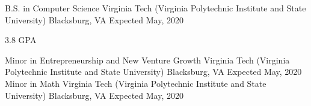 

\begin{cventries}

  \cventry
    {B.S. in Computer Science} %
    {Virginia Tech (Virginia Polytechnic Institute and State University)} %
    {Blacksburg, VA} %
    {Expected May, 2020} %
    {
      \begin{cvitems} %
        \item {3.8 GPA}
      \end{cvitems}
    }
 \cventry
    {Minor in Entrepreneurship and New Venture Growth} %
    {Virginia Tech (Virginia Polytechnic Institute and State University)} %
    {Blacksburg, VA} %
    {Expected May, 2020} %
    {}
  \cventry
    {Minor in Math} %
    {Virginia Tech (Virginia Polytechnic Institute and State University)} %
    {Blacksburg, VA} %
    {Expected May, 2020} %
    {}
\end{cventries}
